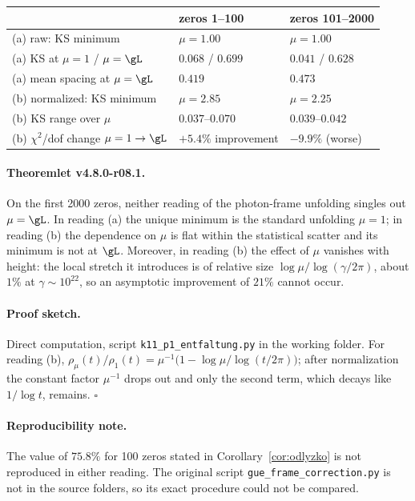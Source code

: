 \begin{center}
\small
\begin{tabular}{@{}>{\raggedright\arraybackslash}p{}>{\raggedright\arraybackslash}p{}>{\raggedright\arraybackslash}p{}@{}}
\toprule
 & zeros 1--100 & zeros 101--2000\\
\midrule
(a) raw: KS minimum & \(\mu=1.00\) & \(\mu=1.00\)\\
(a) KS at \(\mu=1\) / \(\mu=\gL\) & \(0.068\) / \(0.699\) & \(0.041\) / \(0.628\)\\
(a) mean spacing at \(\mu=\gL\) & \(0.419\) & \(0.473\)\\
(b) normalized: KS minimum & \(\mu=2.85\) & \(\mu=2.25\)\\
(b) KS range over \(\mu\) & \(0.037\)--\(0.070\) & \(0.039\)--\(0.042\)\\
(b) \(\chi^2\)/dof change \(\mu=1\to\gL\) & \(+5.4\%\) improvement & \(-9.9\%\) (worse)\\
\bottomrule
\end{tabular}
\end{center}

\paragraph{Theoremlet v4.8.0-r08.1.}
On the first 2000 zeros, neither reading of the photon-frame unfolding singles out \(\mu=\gL\).
In reading (a) the unique minimum is the standard unfolding \(\mu=1\); in reading (b) the
dependence on \(\mu\) is flat within the statistical scatter and its minimum is not at \(\gL\).
Moreover, in reading (b) the effect of \(\mu\) vanishes with height: the local stretch it introduces
is of relative size \(\log\mu/\log(\gamma/2\pi)\), about \(1\%\) at \(\gamma\sim10^{22}\), so an
asymptotic improvement of \(21\%\) cannot occur.

\paragraph{Proof sketch.}
Direct computation, script \texttt{k11\_p1\_entfaltung.py} in the working folder.  For reading (b),
\(\rho_\mu(t)/\rho_1(t)=\mu^{-1}\bigl(1-\log\mu/\log(t/2\pi)\bigr)\); after normalization the constant
factor \(\mu^{-1}\) drops out and only the second term, which decays like \(1/\log t\), remains.
\(\square\)

\paragraph{Reproducibility note.}
The value of \(75.8\%\) for 100 zeros stated in Corollary~\ref{cor:odlyzko} is not reproduced in
either reading.  The original script \texttt{gue\_frame\_correction.py} is not in the source folders,
so its exact procedure could not be compared.

